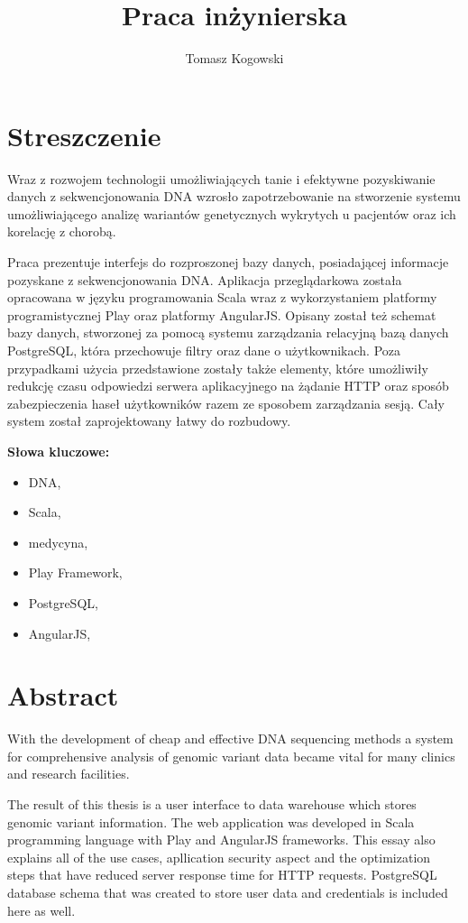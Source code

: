\documentclass[a4paper,12pt,twoside]{article}
\title{Praca inżynierska}
\author{Tomasz Kogowski}
\begin{document}

\newpage 
\newpage\null\thispagestyle{empty}\newpage
\section*{Streszczenie}

Wraz z rozwojem technologii umożliwiających tanie i efektywne
pozyskiwanie danych z sekwencjonowania DNA wzrosło zapotrzebowanie
na stworzenie systemu umożliwiającego analizę wariantów genetycznych wykrytych u pacjentów oraz ich korelację z chorobą.

Praca prezentuje interfejs do rozproszonej bazy danych, posiadającej
informacje pozyskane z sekwencjonowania DNA. Aplikacja przeglądarkowa została opracowana
w języku programowania Scala wraz z wykorzystaniem platformy programistycznej
Play oraz platformy AngularJS. Opisany został też schemat bazy danych,
stworzonej za pomocą systemu zarządzania relacyjną bazą danych PostgreSQL, która
przechowuje filtry oraz dane o użytkownikach.
Poza przypadkami użycia przedstawione zostały także
elementy, które umożliwiły redukcję czasu odpowiedzi serwera
aplikacyjnego na żądanie HTTP oraz sposób zabezpieczenia
haseł użytkowników razem ze sposobem zarządzania sesją.
Cały system został zaprojektowany łatwy do rozbudowy.

\textbf{Słowa kluczowe:}
\begin{itemize}
\item DNA,
\item Scala,
\item medycyna,
\item Play Framework,
\item PostgreSQL,
\item AngularJS,
\end{itemize}
\newpage
\section*{Abstract}

With the development of cheap and effective DNA sequencing methods
a system for comprehensive analysis of genomic variant data became vital for many clinics and research facilities.

The result of this thesis is a user interface to 
data warehouse which stores genomic variant information. 
The web application was developed in Scala programming language with
Play and AngularJS frameworks. This essay also explains all 
of the use cases, apllication security aspect and the optimization steps that have reduced server response time for HTTP requests. PostgreSQL database schema that was created to store user data and credentials is included here as well.
\end{document}

